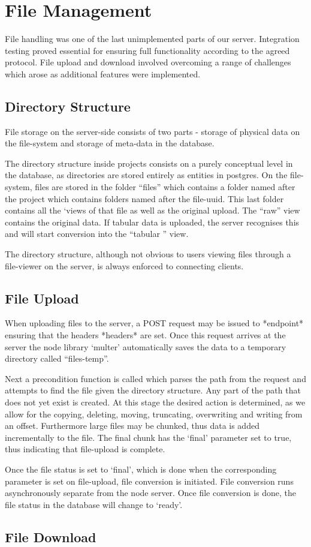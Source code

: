 \section{File Management}
File handling was one of the last unimplemented parts of our server. Integration testing proved essential for ensuring full functionality according to the agreed protocol. File upload and download involved overcoming a range of challenges which arose as additional features were implemented. 
\subsection{Directory Structure}
File storage on the server-side consists of two parts - storage of physical data on the file-system and storage of meta-data in the database. 

The directory structure inside projects consists on a purely conceptual level in the database, as directories are stored entirely as entities in postgres. On the file-system, files are stored in the folder ``files'' which contains a folder named after the project which contains folders named after the file-uuid. This last folder contains all the `views of that file as well as the original upload. The ``raw'' view contains the original data. If tabular data is uploaded, the server recognises this and will start conversion into the ``tabular '' view.

The directory structure, although not obvious to users viewing files through a file-viewer on the server, is always enforced to connecting clients. 

\subsection{File Upload}
When uploading files to the server, a POST request may be issued to *endpoint* ensuring that the headers *headers* are set. Once this request arrives at the server the node library `multer' automatically saves the data to a temporary directory called ``files-temp''. 

Next a precondition function is called which parses the path from the request and attempts to find the file given the directory structure. Any part of the path that does not yet exist is created. At this stage the desired action is determined, as we allow for the copying, deleting, moving, truncating, overwriting and writing from an offset. Furthermore large files may be chunked, thus data is added incrementally to the file. The final chunk has the `final' parameter set to true, thus indicating that file-upload is complete.

Once the file status is set to `final', which is done when the corresponding parameter is set on file-upload, file conversion is initiated. File conversion runs asynchronously separate from the node server. Once file conversion is done, the file status in the database will change to `ready'.

\subsection{File Download}
